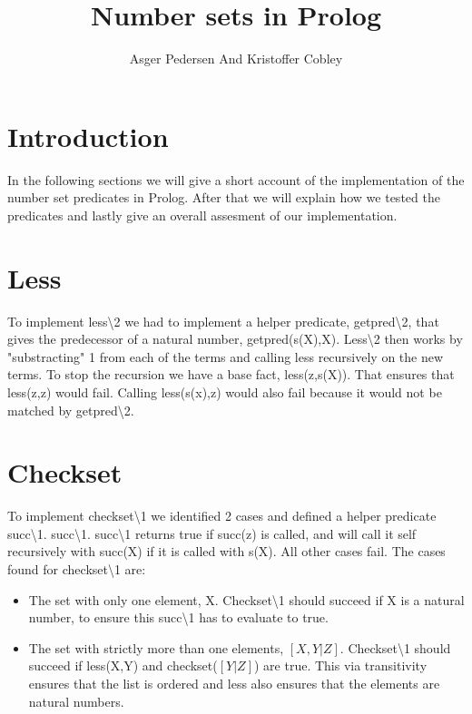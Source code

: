 \documentclass[]{article}
\title{Number sets in Prolog}
\author{ Asger Pedersen And Kristoffer Cobley}
\begin{document}
\ifpdf
{}
\else
{}
\fi

\maketitle
\setcounter{tocdepth}{1}
\tableofcontents
\newpage
\section{Introduction} %
\label{sec:introduction}
In the following sections we will give a short account of the implementation of the number set predicates in Prolog. After that we will explain how we tested the predicates and lastly give an overall assesment of our implementation.
\section{Less} %
\label{sec:less}
To implement less\textbackslash2 we had to implement a helper predicate, getpred\textbackslash2, that gives the predecessor of a natural number, getpred(s(X),X). Less\textbackslash2 then works by "substracting" 1 from each of the terms and calling less recursively on the new terms. To stop the recursion we have a base fact, less(z,s(X)). That ensures that less(z,z) would fail. Calling less(s(x),z) would also fail because it would not be matched by getpred\textbackslash2.
\section{Checkset} %
\label{sec:checkset}
To implement checkset\textbackslash1 we identified 2 cases and defined a helper predicate succ\textbackslash1. succ\textbackslash1. succ\textbackslash1 returns true if succ(z) is called, and will call it self recursively with succ(X) if it is called with s(X). All other cases fail. The cases found for checkset\textbackslash1 are:
\begin{itemize}
	\item The set with only one element, X. Checkset\textbackslash1 should succeed if X is a natural number, to ensure this succ\textbackslash1 has to evaluate to true.
	
	\item The set with strictly more than one elements, $[X,Y|Z]$. Checkset\textbackslash1 should succeed if less(X,Y) and checkset($[Y|Z]$) are true. This via transitivity ensures that the list is ordered and less also  ensures that the elements are natural numbers.
\end{itemize}	
\end{document}
